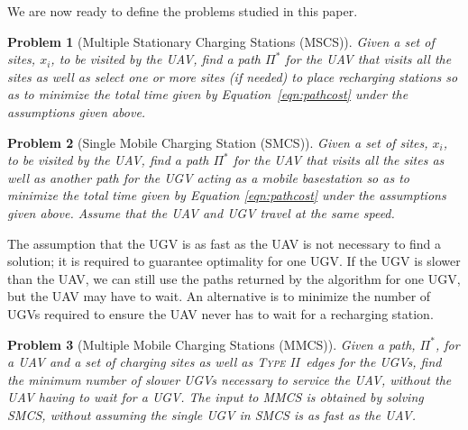 \documentclass[letterpaper,10pt,conference]{ieeeconf}
\newcommand{\typetwo}{\textsc{Type II\ }}
\newtheorem{problem}{Problem}
\begin{document}
We are now ready to define the problems studied in this paper. 

\begin{problem}[Multiple Stationary Charging Stations (MSCS)] \label{problem1}
Given a set of sites, $x_i$, to be visited by the UAV, find a path $\Pi^*$ for the UAV that visits all the sites as well as select one or more sites (if needed) to place recharging stations so as to minimize the total time given by Equation~\ref{eqn:pathcost} under the assumptions given above.
\end{problem}

\begin{problem}[Single Mobile Charging Station (SMCS)] \label{problem2}
Given a set of sites, $x_i$, to be visited by the UAV, find a path $\Pi^*$ for the UAV that visits all the sites as well as another path for the UGV acting as a mobile basestation so as to minimize the total time given by Equation \ref{eqn:pathcost} under the assumptions given above. Assume that the UAV and UGV travel at the same speed.
\end{problem}

The assumption that the UGV is as fast as the UAV is not necessary to find a solution; it is required to guarantee optimality for one UGV. If the UGV is slower than the UAV, we can still use the paths returned by the algorithm for one UGV, but the UAV may have to wait. An alternative is to minimize the number of UGVs required to ensure the UAV never has to wait for a recharging station.

\begin{problem}[Multiple Mobile Charging Stations (MMCS)] \label{problem3}
Given a path, $\Pi^*$, for a UAV and a set of charging sites as well as \typetwo edges for the UGVs, find the minimum number of slower UGVs necessary to service the UAV, without the UAV having to wait for a UGV. The input to MMCS is obtained by solving SMCS, without assuming the single UGV in SMCS is as fast as the UAV.
\end{problem}


\end{document}
